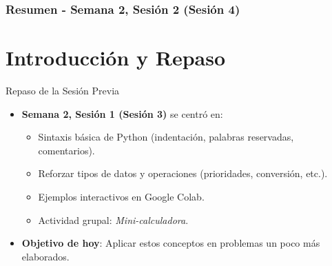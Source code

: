 \documentclass[10pt]{beamer}
\begin{document}
\myfront{}

\begin{frame}
  \titlepage
\end{frame}

\begin{frame}
  \frametitle{Resumen - Semana 2, Sesión 2 (Sesión 4)}
  \tableofcontents
\end{frame}


\section{Introducción y Repaso}

\begin{frame}{Repaso de la Sesión Previa}
  \begin{itemize}
    \item \textbf{Semana 2, Sesión 1 (Sesión 3)} se centró en:
      \begin{itemize}
        \item Sintaxis básica de Python (indentación, palabras reservadas, comentarios).
        \item Reforzar tipos de datos y operaciones (prioridades, conversión, etc.).
        \item Ejemplos interactivos en Google Colab.
        \item Actividad grupal: \textit{Mini-calculadora}.
      \end{itemize}
    \item \textbf{Objetivo de hoy}: Aplicar estos conceptos en problemas un poco más elaborados.
  \end{itemize}
\end{frame}
\end{document}
